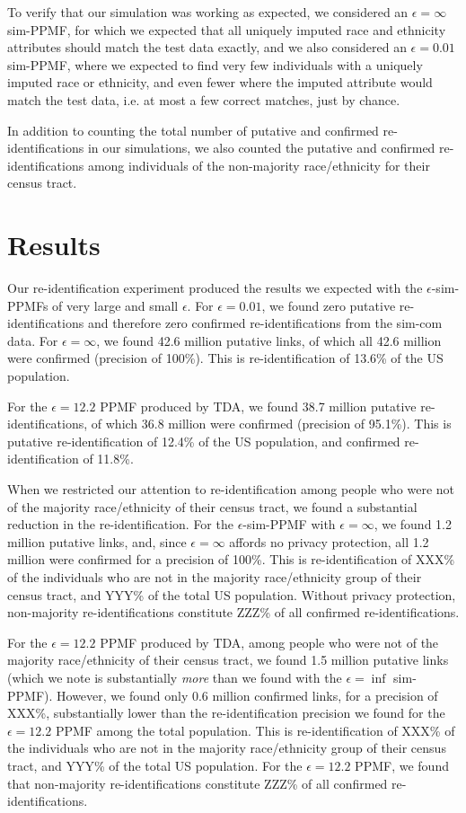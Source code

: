 \documentclass{article}
\begin{document}
To verify that our simulation was working as expected, we considered an $\epsilon=\infty$ sim-PPMF, for which we expected that all uniquely imputed race and ethnicity attributes should match the test data exactly, and we also considered an $\epsilon=0.01$ sim-PPMF, where we expected to find very few individuals with a uniquely imputed race or ethnicity, and even fewer where the imputed attribute would match the test data, i.e. at most a few correct matches, just by chance.

In addition to counting the total number of putative and confirmed re-identifications in our simulations, we also counted the putative and confirmed re-identifications among individuals of the non-majority race/ethnicity for their census tract.

\section{Results}

Our re-identification experiment produced the results we expected with the $\epsilon$-sim-PPMFs of very large and small $\epsilon$.  For $\epsilon=0.01$, we found zero putative re-identifications and therefore zero confirmed re-identifications from the sim-com data.  For $\epsilon=\infty$, we found 42.6 million putative links, of which all 42.6 million were confirmed (precision of 100\%).  This is re-identification of 13.6\% of the US population.

For the $\epsilon=12.2$ PPMF produced by TDA, we found 38.7 million putative re-identifications, of which 36.8 million were confirmed (precision of 95.1\%). This is putative re-identification of 12.4\% of the US population, and confirmed re-identification of 11.8\%.

When we restricted our attention to re-identification among people who were not of the majority race/ethnicity of their census tract, we found a substantial reduction in the re-identification.  For the $\epsilon$-sim-PPMF with $\epsilon=\infty$, we found 1.2 million putative links, and, since $\epsilon=\infty$ affords no privacy protection, all 1.2 million were confirmed for a precision of 100\%.  This is re-identification of XXX\% of the individuals who are not in the majority race/ethnicity group of their census tract, and YYY\% of the total US population.  Without privacy protection, non-majority re-identifications constitute ZZZ\% of all confirmed re-identifications.

For the $\epsilon=12.2$ PPMF produced by TDA, among people who were not of the majority race/ethnicity of their census tract, we found 1.5 million putative links (which we note is substantially \emph{more} than we found with the $\epsilon=\inf$ sim-PPMF).  However, we found only 0.6 million confirmed links, for a precision of XXX\%, substantially lower than the re-identification precision we found for the $\epsilon=12.2$ PPMF among the total population.  This is re-identification of XXX\% of the individuals who are not in the majority race/ethnicity group of their census tract, and YYY\% of the total US population.  For the $\epsilon=12.2$ PPMF, we found that non-majority re-identifications constitute ZZZ\% of all confirmed re-identifications.
\end{document}
